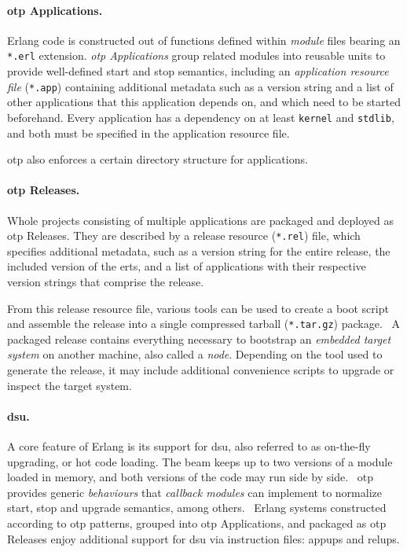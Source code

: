 \paragraph{\acrshort{otp} Applications.}
Erlang code is constructed out of functions defined within \mbox{\emph{module}} files bearing an \lstinline|*.erl| extension. \emph{\acrshort{otp} Applications} group related modules into reusable units to provide well-defined start and stop semantics, including an \emph{application resource file} (\lstinline|*.app|) containing additional metadata such as a version string and a list of other applications that this application depends on, and which need to be started beforehand. Every application has a dependency on at least \lstinline|kernel| and \lstinline|stdlib|, and both must be specified in the application resource file.~\cite{doc:otp}

\acrshort{otp} also enforces a certain directory structure for applications.~\cite{logan:otp}

\paragraph{\acrshort{otp} Releases.} Whole projects consisting of multiple applications are packaged and deployed as \acrshort{otp} Releases. They are described by a release resource (\lstinline|*.rel|) file, which specifies additional metadata, such as a version string for the entire release, the included version of the \acrfull{erts}, and a list of applications with their respective version strings that comprise the release.

From this release resource file, various tools can be used to create a boot script and assemble the release into a single compressed tarball (\lstinline|*.tar.gz|) package.~\cite{doc:otp} A packaged release contains everything necessary to bootstrap an \emph{embedded target system} on another machine, also called a \emph{node}. Depending on the tool used to generate the release, it may include additional convenience scripts to upgrade or inspect the target system.

\paragraph{\acrlong{dsu}.} A core feature of Erlang is its support for \acrfull{dsu}, also referred to as on-the-fly upgrading, or hot code loading. The \acrshort{beam} keeps up to two versions of a module loaded in memory, and both versions of the code may run side by side.~\cite{cesarini:otp} \acrshort{otp} provides generic \emph{behaviours} that \emph{callback modules} can implement to normalize start, stop and upgrade semantics, among others.~\cite{doc:otp} Erlang systems constructed according to \acrshort{otp} patterns, grouped into \acrshort{otp} Applications, and packaged as \acrshort{otp} Releases enjoy additional support for \acrshort{dsu} via instruction files: \acrshort{appup}s and \acrshort{relup}s.

